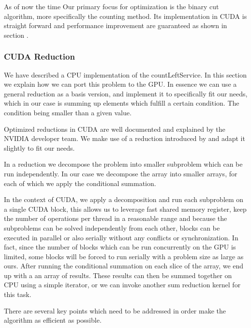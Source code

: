 \documentclass[]{article}
\begin{document}
As of now the time
Our primary focus for optimization is the binary cut algorithm, more specifically the counting method. Its implementation in CUDA is straight forward and performance improvement are guaranteed as shown in section . 

\subsubsection{CUDA Reduction}
We have described a CPU implementation of the countLeftService. In this section we explain how we can port this problem to the GPU. In essence we can use a general reduction as a basis version, and implement it to specifically fit our needs, which in our case is summing up elements which fulfill a certain condition. The condition being smaller than a given value.

Optimized reductions in CUDA are well documented and explained by the NVIDIA developer team. We make use of a reduction introduced by  and adapt it slightly to fit our needs.

In a reduction we decompose the problem into smaller subproblem which can be run independently. In our case we decompose the array into smaller arrays, for each of which we apply the conditional summation. 

In the context of CUDA, we apply a decomposition and run each subproblem on a single CUDA block, this allows us to leverage fast shared memory register, keep the number of operations per thread in a reasonable range and because the subproblems can be solved independently from each other, blocks can be executed in parallel or also serially without any conflicts or synchronization. In fact, since the number of blocks which can be run concurrently on the GPU is limited, some blocks will be forced to run serially with a problem size as large as ours.  After running the conditional summation on each slice of the array, we end up with a an array of results. These results can then be summed together on CPU using a simple iterator, or we can invoke another sum reduction kernel for this task.

There are several key points which need to be addressed in order make the algorithm as efficient as possible. 
\end{document}
